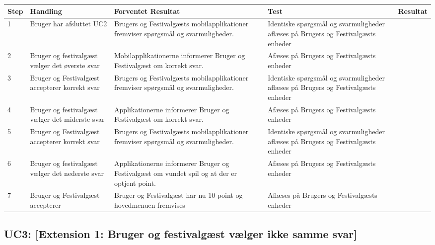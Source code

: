 \begin{longtable}{| p{0.7cm}  | p{3cm}  | p{4cm} |  p{3cm}  | p{3cm}  |}
\hline
Step & Handling & Forventet Resultat & Test & Resultat \\
\hline
1 &  Bruger har afsluttet UC2  &  Brugers og Festivalgæsts mobilapplikationer fremviser spørgsmål og svarmuligheder. & Identiske spørgsmål og svarmuligheder aflæses på Brugers og Festivalgæsts enheder & \FuckingHuge{\checkmark} \\
\hline
2 &  Bruger og festivalgæst vælger det øverste svar &  Mobilapplikationerne informerer Bruger og Festivalgæst om korrekt svar. & Afæses på Brugers og Festivalgæsts enheder & \FuckingHuge{\checkmark}\\ 
\hline
3 &  Bruger og Festivalgæst accepterer korrekt svar  &  Brugers og Festivalgæsts mobilapplikationer fremviser spørgsmål og svarmuligheder. & Identiske spørgsmål og svarmuligheder aflæses på Brugers og Festivalgæsts enheder & \FuckingHuge{\checkmark} \\
\hline
4 &  Bruger og festivalgæst vælger det miderste svar &  Applikationerne informerer Bruger og Festivalgæst om korrekt svar. & Afæses på Brugers og Festivalgæsts enheder & \FuckingHuge{\checkmark}\\ 
\hline
5 &  Bruger og Festivalgæst accepterer korrekt svar  &  Brugers og Festivalgæsts mobilapplikationer fremviser spørgsmål og svarmuligheder. & Identiske spørgsmål og svarmuligheder aflæses på Brugers og Festivalgæsts enheder & \FuckingHuge{\checkmark} \\
\hline
6 &  Bruger og festivalgæst vælger det nederste svar &  Applikationerne informerer Bruger og Festivalgæst om vundet spil og at der er optjent point. & Afæses på Brugers og Festivalgæsts enheder & \FuckingHuge{\checkmark}\\ 
\hline
7 & Bruger og Festivalgæst accepterer  & Bruger og Festivalgæst har nu 10 point og hovedmenuen fremvises & Aflæses på Brugers og Festivalgæsts enheder & \FuckingHuge{\checkmark}\\
\hline
\end{longtable}




\subsection{UC3: [Extension 1: Bruger og festivalgæst vælger ikke samme svar]}

